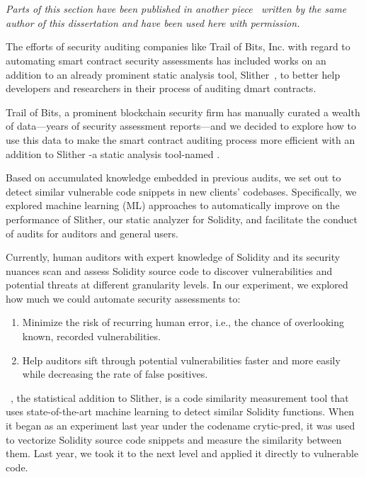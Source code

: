 \section{\slithersimil}

\textit{Parts of this section have been published in another piece~\cite{pilehchiha_2020} written by the same author of this dissertation and have been used here with permission.}

The efforts of security auditing companies like Trail of Bits, Inc. with regard to automating smart contract security assessments has included works on an addition to an already prominent static analysis tool, Slither~\cite{slither}, to better help developers and researchers in their process of auditing dmart contracts.

Trail of Bits, a prominent blockchain security firm has manually curated a wealth of data—years of security assessment reports—and we decided to explore how to use this data to make the smart
contract auditing process more efficient with an addition to Slither -a static analysis tool-named \slithersimil.

Based on accumulated knowledge embedded in previous audits, we set out to detect similar vulnerable code snippets in new clients' codebases.
Specifically, we explored machine learning (ML) approaches to automatically improve on the performance of Slither, our static analyzer for Solidity, and facilitate the conduct of audits for auditors and general users.

Currently, human auditors with expert knowledge of Solidity and its security nuances scan and assess Solidity source code to discover vulnerabilities and potential threats at different granularity levels.
In our experiment, we explored how much we could automate security assessments to:
\begin{enumerate}
  \item Minimize the risk of recurring human error, i.e., the chance of overlooking known, recorded vulnerabilities.
  \item Help auditors sift through potential vulnerabilities faster and more easily while decreasing the rate of false positives.
\end{enumerate}

\slithersimil~\cite{slithersimil}, the statistical addition to Slither, is a code similarity measurement tool that uses state-of-the-art machine learning to detect similar Solidity functions.
When it began as an experiment last year under the codename crytic-pred, it was used to vectorize Solidity source code snippets and measure the similarity between them.
Last year, we took it to the next level and applied it directly to vulnerable code.

